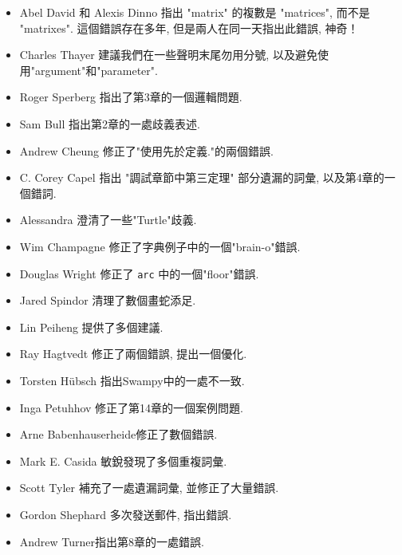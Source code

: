 \documentclass[10pt]{book}
\begin{document}
\begin{itemize}
\item Abel David 和 Alexis Dinno 指出 "matrix" 的複數是 "matrices", 
而不是 "matrixes". 這個錯誤存在多年, 但是兩人在同一天指出此錯誤, 神奇！

\item Charles Thayer 建議我們在一些聲明末尾勿用分號, 以及避免使用"argument"和"parameter". 

\item Roger Sperberg 指出了第3章的一個邏輯問題. 

\item Sam Bull 指出第2章的一處歧義表述. 

\item Andrew Cheung 修正了"使用先於定義."的兩個錯誤.

\item C. Corey Capel 指出 "調試章節中第三定理" 部分遺漏的詞彙, 
以及第4章的一個錯詞. 

\item Alessandra 澄清了一些"Turtle"歧義. 

\item Wim Champagne 修正了字典例子中的一個"brain-o"錯誤. 

\item Douglas Wright 修正了 {\tt arc} 中的一個"floor"錯誤. 

\item Jared Spindor 清理了數個畫蛇添足. 

\item Lin Peiheng 提供了多個建議. 

\item Ray Hagtvedt 修正了兩個錯誤, 提出一個優化. 

\item Torsten H\"{u}bsch 指出Swampy中的一處不一致. 

\item Inga Petuhhov 修正了第14章的一個案例問題. 

\item Arne Babenhauserheide修正了數個錯誤. 

\item Mark E. Casida 敏銳發現了多個重複詞彙. 

\item Scott Tyler 補充了一處遺漏詞彙, 並修正了大量錯誤. 

\item Gordon Shephard 多次發送郵件, 指出錯誤. 

\item Andrew Turner指出第8章的一處錯誤. 


\end{itemize}
\end{document}
